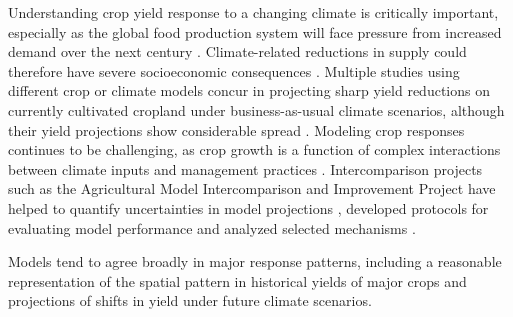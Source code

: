 \documentclass[gmd, manuscript]{copernicus} %
\begin{document}

\introduction
\label{S:1}
Understanding crop yield response to a changing climate is critically important, especially as the global food production system will face pressure from increased demand over the next century \citep{bodirsky2015}. 
Climate-related reductions in supply could therefore have severe socioeconomic consequences \citep[e.g.][]{Stevanovic2016,Wiebe_2015}. 
Multiple studies using different crop or climate models concur in projecting sharp yield reductions on currently cultivated cropland under {business-as-usual} climate scenarios, although their yield projections show considerable spread \citep[e.g.][and references therein]{Rosenzweig2014, Schauberger2017, porter2014}. 
Modeling crop responses continues to be challenging, as crop growth is a function of complex interactions between climate inputs and management practices \citep{Boote13,rotter2011}. 
Intercomparison projects such as the Agricultural Model Intercomparison and Improvement Project \citep[AgMIP][]{ROSENZWEIG2013} have helped to quantify uncertainties in model projections \citep{Rosenzweig2014}, developed protocols \citep{Elliott2015} for evaluating model performance \citep{muller_global_2017} and analyzed selected mechanisms \citep[e.g.][]{Schauberger2017}. 



Models tend to agree broadly in major response patterns, including a reasonable representation of the spatial pattern in historical yields of major crops \citep[e.g.][]{Elliott2015, muller_global_2017} and projections of shifts in yield under future climate scenarios.
\end{document}
